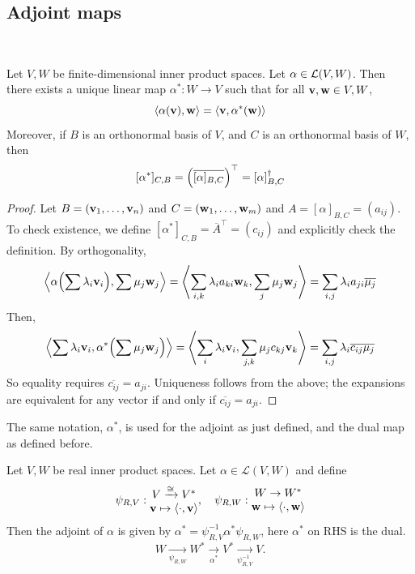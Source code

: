 \documentclass[a4paper]{article}
\begin{document}
\subsection{Adjoint maps}
\ \vspace*{-1.5em}
\begin{definition}
	Let \( V, W \) be finite-dimensional inner product spaces.
	Let \( \alpha \in {\mathcal{L}}(V, W) \).
	Then there exists a unique linear map \( \alpha^* \colon W \to V \) such that for all \( {\bf v}, {\bf w} \in V, W \),
	\[
		\left\langle{\alpha({\bf v}), {\bf w}}\right\rangle = \left\langle{{\bf v}, \alpha^*({\bf w})}\right\rangle
	\]
	Moreover, if \( B \) is an orthonormal basis of \( V \), and \( C \) is an orthonormal basis of \( W \), then
	\[
		[\alpha^*]_{C, B} = \qty(\overline{[\alpha]_{B, C}})^\top = [\alpha]_{B, C}^\dagger
	\]
\end{definition}
\begin{proof}
	Let \( B = ({\bf v}_1, \dots, {\bf v}_n) \) and \( C = ({\bf w}_1, \dots, {\bf w}_m) \) and \( A = [\alpha]_{B, C} = (a_{ij}) \).
	To check existence, we define \( [\alpha^*]_{C, B} = \overline{A}^\top = (c_{ij}) \) and explicitly check the definition.
	By orthogonality,
	\[
		\left\langle{\alpha\qty(\sum \lambda_i {\bf v}_i), \sum \mu_j {\bf w}_j}\right\rangle = \left\langle{\sum_{i,k} \lambda_i a_{ki} {\bf w}_k, \sum_j \mu_j {\bf w}_j}\right\rangle = \sum_{i,j} \lambda_i a_{ji} \overline{\mu_j}
	\]
	Then,
	\[
		\left\langle{\sum \lambda_i {\bf v}_i, \alpha^*\qty(\sum \mu_j {\bf w}_j)}\right\rangle = \left\langle{\sum_i \lambda_i {\bf v}_i, \sum_{j,k} \mu_j c_{kj} {\bf v}_k}\right\rangle = \sum_{i,j} \lambda_i \overline{c_{ij}} \overline{\mu_j}
	\]
	So equality requires \( \overline{c_{ij}} = a_{ji} \).
	Uniqueness follows from the above; the expansions are equivalent for any vector if and only if \( \overline{c_{ij}} = a_{ji} \).
\end{proof}

\begin{remark}
	The same notation, \( \alpha^* \), is used for the adjoint as just defined, and the dual map as defined before.

	Let $ V,W $ be real inner product spaces. Let $ \alpha\in \mathcal{L}(V,W) $ and define 
	\[
		\psi_{R,V}: \begin{matrix}
			 V \xrightarrow{\cong} V^*\\
			 \mathbf{v} \mapsto \left\langle{\cdot, \mathbf{v}}\right\rangle \\
		\end{matrix},\quad \psi_{R,W}: \begin{matrix}
			 W \to W^*  \\
			 \mathbf{w} \mapsto \left\langle{\cdot,\mathbf{w}}\right\rangle \\
		\end{matrix}
	\]
	Then the adjoint of $\alpha$ is given by $ \alpha^* = \psi_{R,V}^{-1} \alpha^* \psi_{R,W}  $, here $\alpha^* $ on RHS is the dual. 
	\[
		W \xrightarrow[\psi_{R,W}]{} W^* \xrightarrow[\alpha^*]{} V^* \xrightarrow[\psi_{R,V}^{-1}]{} V.
	\]
\end{remark}
\end{document}
